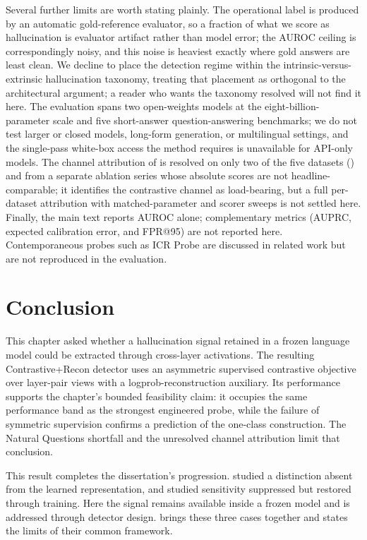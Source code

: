 Several further limits are worth stating plainly. The operational label is
produced by an automatic gold-reference evaluator, so a fraction of what we score
as hallucination is evaluator artifact rather than model error; the AUROC ceiling
is correspondingly noisy, and this noise is heaviest exactly where gold answers
are least clean. We decline to place the detection regime within the
intrinsic-versus-extrinsic hallucination taxonomy, treating that placement as
orthogonal to the architectural argument; a reader who wants the taxonomy resolved
will not find it here. The evaluation spans two open-weights models at the
eight-billion-parameter scale and five short-answer question-answering benchmarks;
we do not test larger or closed models, long-form generation, or multilingual
settings, and the single-pass white-box access the method requires is unavailable
for API-only models. The channel attribution of  is
resolved on only two of the five datasets () and from a
separate ablation series whose absolute scores are not headline-comparable; it
identifies the contrastive channel as load-bearing, but a full per-dataset
attribution with matched-parameter and scorer sweeps is not settled here. Finally, the main
text reports AUROC alone; complementary metrics (AUPRC, expected calibration
error, and FPR@95) are not reported here. Contemporaneous probes such as ICR
Probe are discussed in related work but are not reproduced in the evaluation.

\section{Conclusion}
\label{sec:hd:conclusion}

This chapter asked whether a hallucination signal retained in a frozen language
model could be extracted through cross-layer activations. The resulting
Contrastive+Recon detector uses an asymmetric supervised contrastive objective
over layer-pair views with a logprob-reconstruction auxiliary. Its performance
supports the chapter's bounded feasibility claim: it occupies the same performance
band as the strongest engineered probe, while the failure of symmetric supervision
confirms a prediction of the one-class construction. The Natural Questions
shortfall and the unresolved channel attribution limit that conclusion.

This result completes the dissertation's progression. 
studied a distinction absent from the learned representation, and
 studied sensitivity suppressed but restored
through training. Here the signal remains available inside a frozen model and is
addressed through detector design.  brings these three cases
together and states the limits of their common framework.
